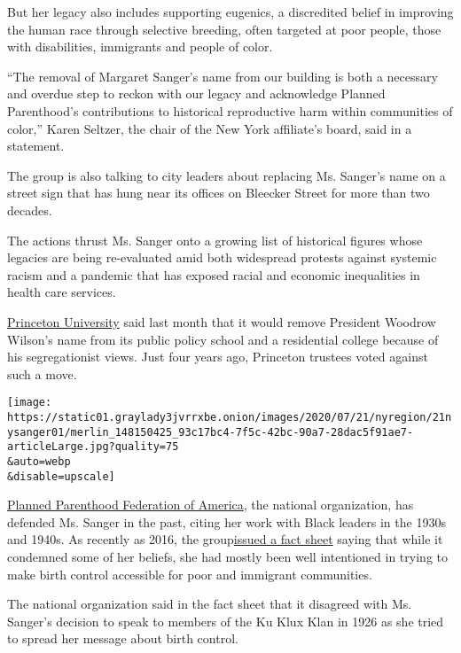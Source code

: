 But her legacy also includes supporting eugenics, a discredited belief
in improving the human race through selective breeding, often targeted
at poor people, those with disabilities, immigrants and people of color.

``The removal of Margaret Sanger's name from our building is both a
necessary and overdue step to reckon with our legacy and acknowledge
Planned Parenthood's contributions to historical reproductive harm
within communities of color,'' Karen Seltzer, the chair of the New York
affiliate's board, said in a statement.

The group is also talking to city leaders about replacing Ms. Sanger's
name on a street sign that has hung near its offices on Bleecker Street
for more than two decades.

The actions thrust Ms. Sanger onto a growing list of historical figures
whose legacies are being re-evaluated amid both widespread protests
against systemic racism and a pandemic that has exposed racial and
economic inequalities in health care services.

\href{https://www.nytimes3xbfgragh.onion/2020/06/27/nyregion/princeton-university-woodrow-wilson.html}{Princeton
University} said last month that it would remove President Woodrow
Wilson's name from its public policy school and a residential college
because of his segregationist views. Just four years ago, Princeton
trustees voted against such a move.

\texttt{[image: https://static01.graylady3jvrrxbe.onion/images/2020/07/21/nyregion/21nysanger01/merlin\_148150425\_93c17bc4-7f5c-42bc-90a7-28dac5f91ae7-articleLarge.jpg?quality=75\\\&auto=webp\\\&disable=upscale]}

\href{https://www.plannedparenthood.org/}{Planned Parenthood Federation
of America}, the national organization, has defended Ms. Sanger in the
past, citing her work with Black leaders in the 1930s and 1940s. As
recently as 2016, the
group\href{https://www.plannedparenthood.org/uploads/filer_public/37/fd/37fdc7b6-de5f-4d22-8c05-9568268e92d8/sanger_opposition_claims_fact_sheet_2016.pdf}{issued
a fact sheet} saying that while it condemned some of her beliefs, she
had mostly been well intentioned in trying to make birth control
accessible for poor and immigrant communities.

The national organization said in the fact sheet that it disagreed with
Ms. Sanger's decision to speak to members of the Ku Klux Klan in 1926 as
she tried to spread her message about birth control.

